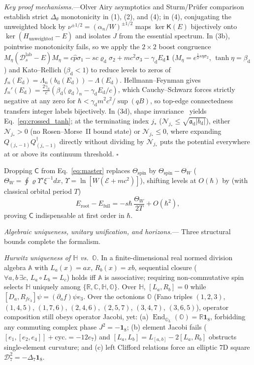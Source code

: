 \documentclass[aps,prl,reprint,superscriptaddress,nofootinbib,floatfix]{revtex4-2}
\theoremstyle{prlthm}
\newcommand{\prlsec}[1]{\par\smallskip\noindent\emph{#1.}---}
\begin{document}
\emph{Key proof mechanisms.}---Olver Airy asymptotics and Sturm/Pr\"ufer comparison establish strict $\Delta_\theta$ monotonicity in (1), (2), and (4); in (4), conjugating the unweighted block by $\nu^{\pm 1/2}=(\alpha_n/W)^{\pm 1/2}$ maps $\ker\mathsf{K}(E)$ bijectively onto $\ker(H_\text{unweighted}-E)$ and isolates $J$ from the essential spectrum. In (3b), pointwise monotonicity fails, so we apply the $2\times 2$ boost congruence $M_\eta(\mathcal{D}_s^\text{lab}-E)M_\eta=c\hat{p}\sigma_1-sc\varrho_\text{d}\sigma_2+mc^2\sigma_3-\gamma_\text{d}E_\text{d}\mathbf{1}$ ($M_\eta=e^{\frac{1}{2}s\eta\sigma_2}$, $\tanh\eta=\beta_\text{d}$) and Kato--Rellich ($\beta_\text{d}<1$) to reduce levels to zeros of $f_n(E_\text{d})=\Lambda_n(b_\text{d}(E_\text{d}))-\Lambda(E_\text{d})$. Hellmann--Feynman gives $f_n'(E_\text{d})=\frac{2\gamma_\text{d}}{c}(\beta_\text{d}\langle\varrho_\text{d}\rangle_n-\gamma_\text{d}E_\text{d}/c)$, which Cauchy--Schwarz forces strictly negative at any zero for $\hbar<\gamma_\text{d}m^2c^2/\sup(qB)$, so top-edge connectedness transfers integer labels bijectively. In (3d), shape invariance~\citep{CooperKhareSukhatme1995Supersymmetry} yields Eq.~\eqref{eq:crossed_tanh}; at the terminating index $j_*$ ($\mathcal{N}_{j_*}\le\sqrt{\mathfrak{a}_\text{d}|b_\text{d}|}$), either $\mathcal{N}_{j_*}>0$ (no Rosen--Morse~II bound state) or $\mathcal{N}_{j_*}\le 0$, where expanding $Q_{(j_*-1)}Q_{(j_*-1)}^\dagger$ directly without dividing by $\mathcal{N}_{j_*}$ puts the potential everywhere at or above its continuum threshold. \hfill$\square$

Dropping $\mathsf{C}$ from Eq.~\eqref{eq:master} replaces $\Theta_\text{spin}$ by $\Theta_\text{spin}-\Theta_W$ ($\Theta_W=\oint\varrho\Upsilon'\xi^{-1}dx$, $\Upsilon=\ln[W(\mathcal{E}+mc^2)]$), shifting levels at $O(\hbar)$ by (with classical orbital period $T$)
\begin{equation}
  E_\text{root}-E_\text{full}=-s\hbar\,\frac{\Theta_W}{2T}+O(\hbar^2),
  \label{eq:root_shift}
\end{equation}
proving $\mathsf{C}$ indispensable at first order in $\hbar$.

\prlsec{Algebraic uniqueness, unitary unification, and horizons}
Three structural bounds complete the formalism.

\emph{Hurwitz uniqueness of $\mathbb{H}$ vs.\ $\mathbb{O}$.} In a finite-dimensional real normed division algebra $\mathbb{A}$ with $L_a(x)=ax$, $R_b(x)=xb$, sequential closure ($\forall a,b\,\exists c,\,L_a\circ L_b=L_c$) holds iff $\mathbb{A}$ is associative; requiring non-commutative spin selects $\mathbb{H}$ uniquely among $\{\mathbb{R},\mathbb{C},\mathbb{H},\mathbb{O}\}$. Over $\mathbb{H}$, $[L_a,R_b]=0$ while $[D_a,R_{fe_3}]\psi=(\partial_a f)\psi e_3$. Over the octonions $\mathbb{O}$ (Fano triples $(1,2,3)$, $(1,4,5)$, $(1,7,6)$, $(2,4,6)$, $(2,5,7)$, $(3,4,7)$, $(3,6,5)$), operator composition still obeys operator Jacobi, yet: (a) $\operatorname{End}_{\mathbb{O}_L}(\mathbb{O})=\mathbb{R}\mathbf{1}_8$, forbidding any commuting complex phase $J^2=-\mathbf{1}_8$; (b) element Jacobi fails ($[e_1,[e_2,e_4]]+\text{cyc.}=-12e_7$) and $[L_a,L_b]=L_{[a,b]}-2[L_a,R_b]$ obstructs single-element curvature; and (c) left Clifford relations force an elliptic 7D square $\mathcal{D}_7^2=-\Delta_7\mathbf{1}_8$.
\end{document}

